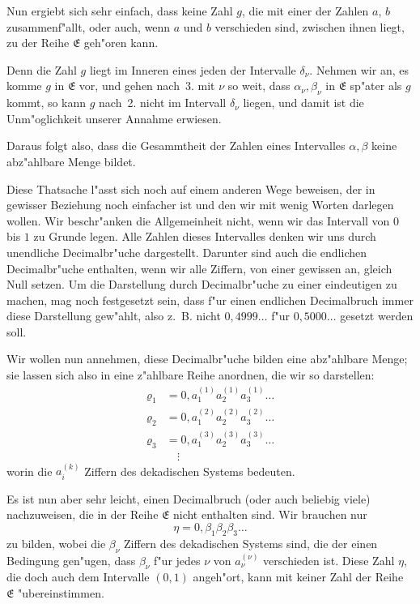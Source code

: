\documentclass[10pt,a4paper]{article}
\theoremstyle{weberstyle}
\begin{document}
Nun ergiebt sich sehr einfach, dass keine Zahl $g$, die mit einer der
Zahlen $a$, $b$ zusammenf"allt, oder auch, wenn $a$ und $b$ verschieden
sind, zwischen ihnen liegt, zu der Reihe $\mathfrak{E}$ geh"oren kann.

Denn die Zahl $g$ liegt im Inneren eines jeden der Intervalle
$\delta_\nu$. Nehmen wir an, es komme $g$ in $\mathfrak{E}$ vor, und gehen
nach~3. mit $\nu$ so weit, dass $\alpha_\nu,\beta_\nu$ in $\mathfrak{E}$ sp"ater als
$g$ kommt, so kann $g$ nach~2. nicht im Intervall $\delta_\nu$ liegen, und
damit ist die Unm"oglichkeit unserer Annahme erwiesen.

Daraus folgt also, dass die Gesammtheit der Zahlen eines Intervalles
$\alpha,\beta$ keine abz"ahlbare Menge bildet.

Diese Thatsache l"asst sich noch auf einem anderen Wege beweisen, der in
gewisser Beziehung noch einfacher ist und den wir mit wenig Worten
darlegen wollen. Wir beschr"anken die Allgemeinheit nicht, wenn wir das
Intervall von $0$ bis $1$ zu Grunde legen. Alle Zahlen dieses Intervalles
denken wir uns durch unendliche Decimalbr"uche dargestellt. Darunter sind
auch die endlichen Decimalbr"uche enthalten, wenn wir alle Ziffern, von
einer gewissen an, gleich Null setzen. Um die Darstellung durch
Decimalbr"uche zu einer eindeutigen zu machen, mag noch festgesetzt sein,
dass f"ur einen endlichen Decimalbruch immer diese Darstellung gew"ahlt,
also z.~B. nicht $0{,}4999\dots$ f"ur $0{,}5000\dots$ gesetzt werden soll.

Wir wollen nun annehmen, diese Decimalbr"uche bilden eine abz"ahlbare
Menge; sie lassen sich also in eine z"ahlbare Reihe anordnen, die wir so
darstellen:
\begin{align*}
\varrho_1 &= 0{,}a_1^{(1)}a_2^{(1)}a_3^{(1)}\dots\\
\varrho_2 &= 0{,}a_1^{(2)}a_2^{(2)}a_3^{(2)}\dots\\
\varrho_3 &= 0{,}a_1^{(3)}a_2^{(3)}a_3^{(3)}\dots\\
&\quad\vdots
\end{align*}
worin die $a_i^{(k)}$ Ziffern des dekadischen Systems bedeuten.

Es ist nun aber sehr leicht, einen Decimalbruch (oder auch beliebig
viele) nachzuweisen, die in der Reihe $\mathfrak{E}$ nicht enthalten sind. Wir
brauchen nur
\[
\eta = 0{,}\beta_1\beta_2\beta_3\dots
\]
zu bilden, wobei die $\beta_\nu$ Ziffern des dekadischen Systems sind, die
der einen Bedingung gen"ugen, dass $\beta_\nu$ f"ur jedes $\nu$ von
$a_\nu^{(\nu)}$ verschieden ist. Diese Zahl $\eta$, die doch auch dem
Intervalle $(0,1)$ angeh"ort, kann mit keiner Zahl der Reihe
$\mathfrak{E}$ "ubereinstimmen.
\end{document}
